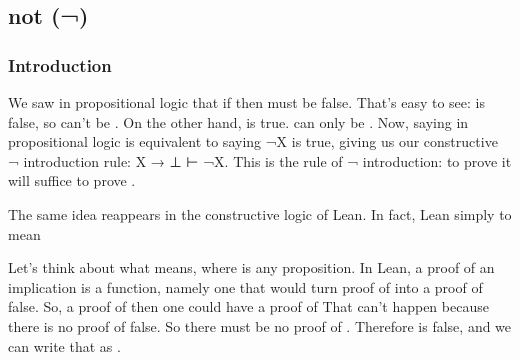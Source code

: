 \documentclass[letterpaper,10pt,english]{sphinxmanual}
\begin{document}
\subsection{not (¬)}
\label{\detokenize{A_02_Constructive_Logic:not}}
\begin{sphinxVerbatim}[commandchars=\\\{\}]
\end{sphinxVerbatim}


\subsubsection{Introduction}
\label{\detokenize{A_02_Constructive_Logic:id1}}
\sphinxAtStartPar
We saw in propositional logic that if  then
 must be false. That’s easy to see:  is
false, so  can’t be . On the other hand,  is true.  can only be . Now, saying  in propositional logic is equivalent to saying
¬X is true, giving us our constructive ¬ introduction rule:
X → ⊥ ⊢ ¬X. This is the rule of ¬ introduction: to prove
 it will suffice to prove .

\sphinxAtStartPar
The same idea reappears in the constructive logic of Lean.
In fact, Lean simply   to mean 

\begin{sphinxVerbatim}[commandchars=\\\{\}]
 

      
     
 
\end{sphinxVerbatim}

\sphinxAtStartPar
Let’s think about what  means, where  is any
proposition. In Lean, a proof of an implication is a function,
namely one that would turn  proof of  into a proof of
false. So,  a proof of  then one could have
a proof of  That can’t happen because there is no proof
of false. So there must be no proof of . Therefore  is
false, and we can write that as .
\end{document}
